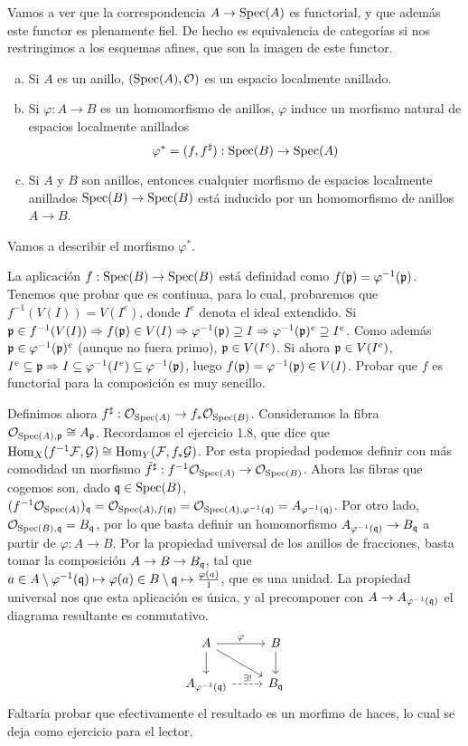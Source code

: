 \documentclass[GA.tex]{subfiles}
\begin{document}
Vamos a ver que la correspondencia $A\to\operatorname{Spec}(A)$ es functorial, y que además este functor es plenamente fiel. De hecho es equivalencia de categorías si nos restringimos a los esquemas afines, que son la imagen de este functor. 
\begin{prop}
\begin{enumerate}[(a)]
\item Si $A$ es un anillo, $(\operatorname{Spec}(A), {\mathcal O})$ es un espacio localmente anillado.
\item Si $\varphi:A\to B$ es un homomorfismo de anillos, $\varphi$ induce un morfismo natural de espacios localmente anillados
\[
\varphi^*=(f,f^\sharp):\operatorname{Spec}(B)\to\operatorname{Spec}(A)
\]
\item Si $A$ y $B$ son anillos, entonces cualquier morfismo de espacios localmente anillados $\operatorname{Spec}(B)\to\operatorname{Spec}(B)$ está inducido por un homomorfismo de anillos $A\to B$. 
\end{enumerate}
\end{prop}
\begin{dem}
Vamos a describir el morfismo $\varphi^*$. 

La aplicación $f:\operatorname{Spec}(B)\to\operatorname{Spec}(B)$ está definidad como $f({\mathfrak{p}})=\varphi^{-1}({\mathfrak{p}})$. Tenemos que probar que es continua, para lo cual, probaremos que $f^{-1}(V(I))=V(I^e)$, donde $I^e$ denota el ideal extendido. Si ${\mathfrak{p}}\in f^{-1}(V(I))\Rightarrow f({\mathfrak{p}})\in V(I)\Rightarrow \varphi^{-1}({\mathfrak{p}})\supseteq I\Rightarrow \varphi^{-1}({\mathfrak{p}})^e\supseteq I^e$. Como además ${\mathfrak{p}}\in\varphi^{-1}({\mathfrak{p}})^e$ (aunque no fuera primo), ${\mathfrak{p}}\in V(I^e)$. Si ahora ${\mathfrak{p}}\in V(I^e)$, $I^e\subseteq{\mathfrak{p}}\Rightarrow I\subseteq \varphi^{-1}(I^e)\subseteq \varphi^{-1}({\mathfrak{p}})$, luego $f({\mathfrak{p}})=\varphi^{-1}({\mathfrak{p}})\in V(I)$. Probar que $f$ es functorial para la composición es muy sencillo.

Definimos ahora $f^\sharp:{\mathcal O}_{\operatorname{Spec}(A)}\to f_*{\mathcal O}_{\operatorname{Spec}(B)}$. Consideramos la fibra ${\mathcal O}_{\operatorname{Spec}(A),{\mathfrak{p}}}\cong A_{{\mathfrak{p}}}$. Recordamos el ejercicio 1.8, que dice que $\operatorname{Hom}_X(f^{-1}\mathcal{F},\mathcal{G})\cong\operatorname{Hom}_Y(\mathcal{F}, f_*\mathcal{G})$. Por esta propiedad podemos definir con más comodidad un morfismo $\tilde{f}^\sharp:f^{-1}{\mathcal O}_{\operatorname{Spec}(A)}\to {\mathcal O}_{\operatorname{Spec}(B)}$. Ahora las fibras que cogemos son, dado ${\mathfrak{q}}\in\operatorname{Spec}(B)$, $(f^{-1}{\mathcal O}_{\operatorname{Spec}(A)})_{{\mathfrak{q}}}={\mathcal O}_{\operatorname{Spec}(A), f({\mathfrak{q}})}={\mathcal O}_{\operatorname{Spec}(A), \varphi^{-1}({\mathfrak{q}})}=A_{\varphi^{-1}({\mathfrak{q}})}$. Por otro lado, ${\mathcal O}_{\operatorname{Spec}(B),{\mathfrak{q}}}=B_{{\mathfrak{q}}}$, por lo que basta definir un homomorfismo $A_{\varphi^{-1}({\mathfrak{q}})}\to B_{{\mathfrak{q}}}$ a partir de $\varphi:A\to B$. Por la propiedad universal de los anillos de fracciones, basta tomar la composición $A\to B\to B_{{\mathfrak{q}}}$, tal que $a\in A\setminus\varphi^{-1}({\mathfrak{q}})\mapsto\varphi(a)\in B\setminus{\mathfrak{q}}\mapsto \frac{\varphi(a)}{1}$, que es una unidad. La propiedad universal nos que esta aplicación es única, y al precomponer con $A\to A_{\varphi^{-1}({\mathfrak{q}})}$ el diagrama resultante es conmutativo. 
\[
\begin{tikzcd}
A\arrow[r,"\varphi"] \arrow[dr]\arrow[d] & B\arrow[d]\\
A_{\varphi^{-1}(\q)}\arrow[r, dashed, "\exists!"] & B_{\q}
\end{tikzcd}
\]
Faltaría probar que efectivamente el resultado es un morfimo de haces, lo cual se deja como ejercicio para el lector. 


\end{dem}
\end{document}

